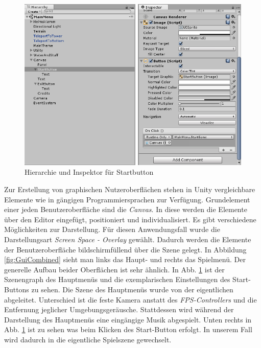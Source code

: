 %

\begin{figure}[h]
	\centering
	\includegraphics[width=0.95\linewidth]{Abbildungen/Unity/GuiExample}
	\caption{Hierarchie und Inspektor für Startbutton}
	\label{fig:GuiExample}
\end{figure}

Zur Erstellung von graphischen Nutzeroberflächen stehen in Unity vergleichbare Elemente wie in gängigen Programmiersprachen zur Verfügung. Grundelement einer jeden Benutzeroberfläche sind die \textit{Canvas}. In diese werden die Elemente über den Editor eingefügt, positioniert und individualisiert.  Es gibt verschiedene Möglichkeiten zur Darstellung. Für diesen Anwendungsfall wurde die Darstellungsart \textit{Screen Space - Overlay} gewählt. Dadurch werden die Elemente der Benutzeroberfläche bildschirmfüllend über die Szene gelegt. In Abbildung \ref{fig:GuiCombined} sieht man links das Haupt- und rechts das Spielmenü. Der generelle Aufbau beider Oberflächen ist sehr ähnlich. In Abb. \ref{fig:GuiExample} ist der Szenengraph des Hauptmenüs und die exemplarischen Einstellungen des Start-Buttons zu sehen. Die Szene des Hauptmenüs wurde von der eigentlichen abgeleitet. Unterschied ist die feste Kamera anstatt des \textit{FPS-Controllers} und die Entfernung jeglicher Umgebungsgeräusche. Stattdessen wird während der Darstellung des Hauptmenüs eine eingängige Musik abgespielt. Unten rechts in Abb. \ref{fig:GuiExample} ist zu sehen was beim Klicken des Start-Button erfolgt. In unserem Fall wird dadurch in die eigentliche Spielszene gewechselt.

